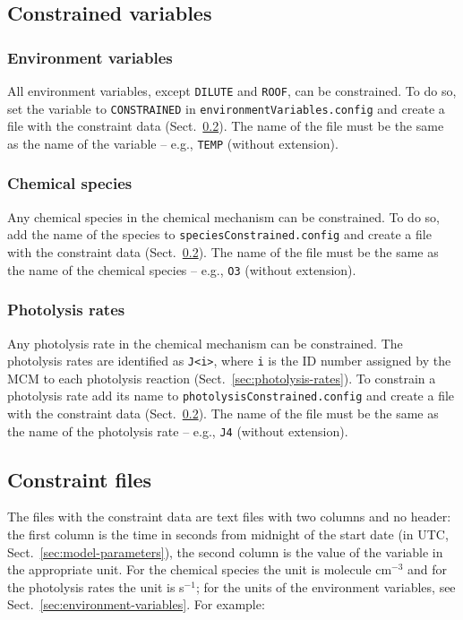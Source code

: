 \subsection{Constrained variables} \label{subsec:constrained-variables}

\subsubsection{Environment variables}

All environment variables, except \texttt{DILUTE} and \texttt{ROOF},
can be constrained. To do so, set the variable to \texttt{CONSTRAINED}
in \texttt{environmentVariables.config} and create a file with the
constraint data (Sect.~\ref{subsec:constraint-files}). The name of the
file must be the same as the name of the variable -- e.g.,
\texttt{TEMP} (without extension).

\subsubsection{Chemical species}

Any chemical species in the chemical mechanism can be constrained. To
do so, add the name of the species to
\texttt{speciesConstrained.config} and create a file with the
constraint data (Sect.~\ref{subsec:constraint-files}). The name of the
file must be the same as the name of the chemical species -- e.g.,
\texttt{O3} (without extension).

\subsubsection{Photolysis rates}

Any photolysis rate in the chemical mechanism can be constrained. The
photolysis rates are identified as \texttt{J<i>}, where \texttt{i} is
the ID number assigned by the MCM to each photolysis reaction
(Sect.~\ref{sec:photolysis-rates}). To constrain a photolysis rate add
its name to \texttt{photolysisConstrained.config} and create a file
with the constraint data (Sect.~\ref{subsec:constraint-files}). The
name of the file must be the same as the name of the photolysis rate
-- e.g., \texttt{J4} (without extension).

\subsection{Constraint files} \label{subsec:constraint-files}

The files with the constraint data are text files with two columns and
no header: the first column is the time in seconds from midnight of
the start date (in UTC, Sect.~\ref{sec:model-parameters}), the second
column is the value of the variable in the appropriate unit. For the
chemical species the unit is molecule cm$^{-3}$ and for the photolysis
rates the unit is s$^{-1}$; for the units of the environment
variables, see Sect.~\ref{sec:environment-variables}. For example:

